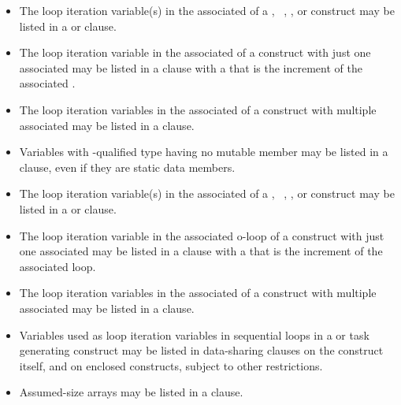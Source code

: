 \begin{ccppspecific}
\begin{itemize}
\item The loop iteration variable(s) in the associated  of a ,
~, , or  construct may be listed in a  or  clause.

\item The loop iteration variable in the associated  of a  construct with just
one associated  may be listed in a  clause with a
that is the increment of the associated .

\item The loop iteration variables in the associated  of a  construct with
multiple associated  may be listed in a  clause.

\item Variables with -qualified type having no mutable member may be listed in a
 clause, even if they are static data members.
\end{itemize}
\end{ccppspecific}
%
\begin{fortranspecific}
\begin{itemize}
\item The loop iteration variable(s) in the associated  of a ,
~, , or 
construct may be listed in a  or  clause.

\item The loop iteration variable in the associated o-loop of a  construct with just
one associated  may be listed in a  clause with a 
that is the increment of the associated loop.

\item The loop iteration variables in the associated  of a  construct with
multiple associated  may be listed in a  clause.

\item Variables used as loop iteration variables in sequential loops in a 
or task generating construct may be listed in data-sharing clauses on the construct itself, and on
enclosed constructs, subject to other restrictions.

\item Assumed-size arrays may be listed in a  clause.
\end{itemize}
\end{fortranspecific}


